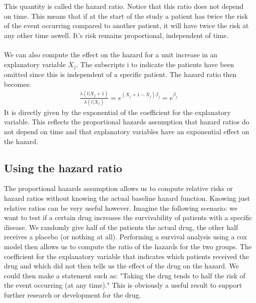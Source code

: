 This quantity is called the hazard ratio. Notice that this ratio does not depend on time. This means that if at the start of the study a patient has twice the risk of the event occurring compared to another patient, it will have twice the risk at any other time aswell. It's risk remains proportional, independent of time. \\ \\
We can also compute the effect on the hazard for a unit increase in an explanatory variable $X_{j}$. The subscripts i to indicate the patients have been omitted since this is independent of a specific patient. The hazard ratio then becomes:
\begin{equation}
\begin{split}
\frac{\lambda(t|X_{j}+1)}{\lambda(t|X_{j})} = e^{(X_{j}+1-X_{j})\beta_{j}} = e^{\beta_{j}}
\end{split}
\end{equation}
It is directly given by the exponential of the coefficient for the explanatory variable. This reflects the proportional hazards assumption that hazard ratios do not depend on time and that explanatory variables have an exponential effect on the hazard.
\subsection{Using the hazard ratio}
The proportional hazards assumption allows us to compute relative risks or hazard ratios without knowing the actual baseline hazard function. Knowing just relative ratios can be very useful however. Imagine the following scenario: we want to test if a certain drug increases the survivability of patients with a specific disease. We randomly give half of the patients the actual drug, the other half receives a placebo (or nothing at all). Performing a survival analysis using a cox model then allows us to compute the ratio of the hazards for the two groups. The coefficient for the explanatory variable that indicates which patients received the drug and which did not then tells us the effect of the drug on the hazard. We could then make a statement such as: "Taking the drug tends to half the risk of the event occurring (at any time)." This is obviously a useful result to support further research or development for the drug.

